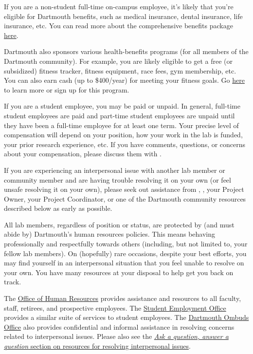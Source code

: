 \documentclass{tufte-book} %
\begin{document}

If you are a non-student full-time on-campus employee, it's likely that
you're eligible for Dartmouth benefits, such as medical insurance,
dental insurance, life insurance, etc.  You can read more about the
comprehensive benefits package \href{http://www.dartmouth.edu/~hrs/benefits/}{here}.

Dartmouth also sponsors various health-benefits programs (for all
members of the Dartmouth community).  For example, you are likely
eligible to get a free (or subsidized) fitness tracker, fitness
equipment, race fees, gym membership, etc.  You can also earn cash (up
to \$400/year) for meeting your fitness goals.  Go
\href{http://join.virginpulse.com/dartmouth/}{here} to learn more or
sign up for this program.

If you are a student employee, you may be paid or unpaid.  In general,
full-time student employees are paid and part-time student employees
are unpaid until they have been a full-time employee for at least one
term.  Your precise level of compensation will depend on your
position, how your work in the lab is funded, your prior research
experience, etc.  If you have comments, questions, or concerns about
your compensation, please discuss them with \director.


If you are experiencing an interpersonal issue with another lab member
or community member and are having trouble resolving it on your own (or feel
unsafe resolving it on your own), please seek out assistance from
\director, \coordinator, your Project Owner, your Project Coordinator,
or one of the Dartmouth community resources described below as early
as possible.

All lab members, regardless of position or status, are protected by
(and must abide by) Dartmouth's human resources policies.  This means
behaving professionally and respectfully towards others (including,
but not limited to, your fellow lab members).  On (hopefully) rare
occasions, despite your best efforts, you may find yourself in an
interpersonal situation that you feel unable to resolve on your own.
You have many resources at your disposal to help get you back on
track.

The \href{http://www.dartmouth.edu/~hrs/}{Office of Human Resources}
provides assistance and resources to all faculty, staff, retirees, and
prospective employees. The
\href{http://www.dartmouth.edu/~seo/}{Student Employment Office}
provides a similar suite of services to student employees.  The
\href{http://www.dartmouth.edu/~ombuds/}{Dartmouth Ombuds Office} also
provides confidential and informal assistance in resolving concerns
related to interpersonal issues.  Please also see the
\hyperref[sec:interpersonal]{\textit{Ask a question, answer a question} section on resources for resolving interpersonal issues}.
\end{document}
